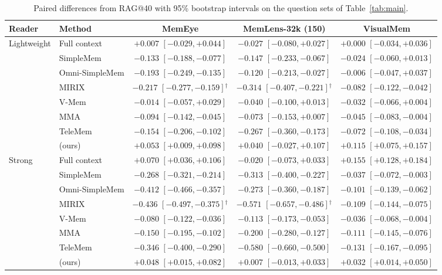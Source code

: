 \begin{table}[t]
\centering
\caption{Paired differences from RAG@40 with 95\% bootstrap intervals on the question sets of Table~\ref{tab:main}.}
\label{tab:baselines_ci}
\small
\begin{tabular}{llccc}
\toprule
Reader & Method & MemEye & MemLens-32k (150) & VisualMem \\
\midrule
Lightweight & Full context & $+0.007$ $[-0.029, +0.044]$ & $-0.027$ $[-0.080, +0.027]$ & $+0.000$ $[-0.034, +0.036]$ \\
 & SimpleMem & $-0.133$ $[-0.188, -0.077]$ & $-0.147$ $[-0.233, -0.067]$ & $-0.024$ $[-0.060, +0.013]$ \\
 & Omni-SimpleMem & $-0.193$ $[-0.249, -0.135]$ & $-0.120$ $[-0.213, -0.027]$ & $-0.006$ $[-0.047, +0.037]$ \\
 & MIRIX & $-0.217$ $[-0.277, -0.159]$$^{\dagger}$ & $-0.314$ $[-0.407, -0.221]$$^{\dagger}$ & $-0.082$ $[-0.122, -0.042]$ \\
 & V-Mem & $-0.014$ $[-0.057, +0.029]$ & $-0.040$ $[-0.100, +0.013]$ & $-0.032$ $[-0.066, +0.004]$ \\
 & MMA & $-0.094$ $[-0.142, -0.045]$ & $-0.073$ $[-0.153, +0.007]$ & $-0.045$ $[-0.083, -0.004]$ \\
 & TeleMem & $-0.154$ $[-0.206, -0.102]$ & $-0.267$ $[-0.360, -0.173]$ & $-0.072$ $[-0.108, -0.034]$ \\
 & \vgs{} (ours) & $+0.053$ $[+0.009, +0.098]$ & $+0.040$ $[-0.027, +0.107]$ & $+0.115$ $[+0.075, +0.157]$ \\
\midrule
Strong & Full context & $+0.070$ $[+0.036, +0.106]$ & $-0.020$ $[-0.073, +0.033]$ & $+0.155$ $[+0.128, +0.184]$ \\
 & SimpleMem & $-0.268$ $[-0.321, -0.214]$ & $-0.313$ $[-0.400, -0.227]$ & $-0.037$ $[-0.072, -0.003]$ \\
 & Omni-SimpleMem & $-0.412$ $[-0.466, -0.357]$ & $-0.273$ $[-0.360, -0.187]$ & $-0.101$ $[-0.139, -0.062]$ \\
 & MIRIX & $-0.436$ $[-0.497, -0.375]$$^{\dagger}$ & $-0.571$ $[-0.657, -0.486]$$^{\dagger}$ & $-0.109$ $[-0.144, -0.075]$ \\
 & V-Mem & $-0.080$ $[-0.122, -0.036]$ & $-0.113$ $[-0.173, -0.053]$ & $-0.036$ $[-0.068, -0.004]$ \\
 & MMA & $-0.150$ $[-0.195, -0.102]$ & $-0.200$ $[-0.280, -0.127]$ & $-0.111$ $[-0.145, -0.076]$ \\
 & TeleMem & $-0.346$ $[-0.400, -0.290]$ & $-0.580$ $[-0.660, -0.500]$ & $-0.131$ $[-0.167, -0.095]$ \\
 & \vgs{} (ours) & $+0.048$ $[+0.015, +0.082]$ & $+0.007$ $[-0.013, +0.033]$ & $+0.032$ $[+0.014, +0.050]$ \\
\bottomrule
\end{tabular}
\end{table}
